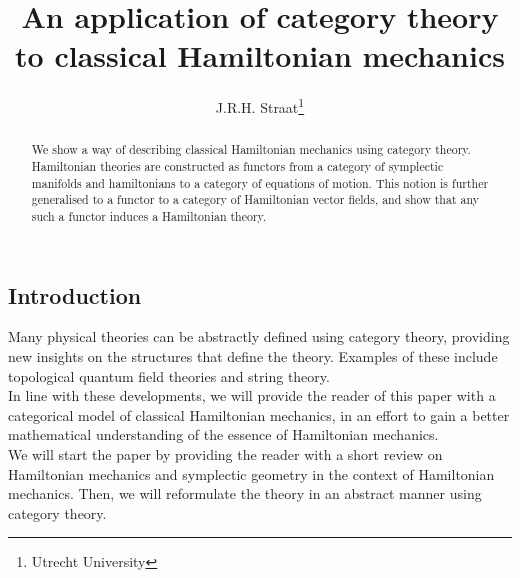 \documentclass{article}
\title{An application of category theory to classical Hamiltonian mechanics}
\author{J.R.H. Straat\thanks{Utrecht University}}%
\date{}
\begin{document}
\maketitle
%
\begin{abstract}
	We show a way of describing classical Hamiltonian mechanics using category theory. Hamiltonian theories are constructed as functors from a category of symplectic manifolds and hamiltonians to a category of equations of motion. This notion is further generalised to a functor to a category of Hamiltonian vector fields, and show that any such a functor induces a Hamiltonian theory.
\end{abstract}
%
\begin{multicols}{2}
	\section{Introduction}
	Many physical theories can be abstractly defined using category theory, providing new insights on the structures that define the theory. Examples of these include topological quantum field theories\cite{BaezTQFT} and string theory\cite{Douglas_2001}.\\
	In line with these developments, we will provide the reader of this paper with a categorical model of classical Hamiltonian mechanics, in an effort to gain a better mathematical understanding of the essence of Hamiltonian mechanics.\\
	We will start the paper by providing the reader with a short review on Hamiltonian mechanics and symplectic geometry in the context of Hamiltonian mechanics. Then, we will reformulate the theory in an abstract manner using category theory.

\end{multicols}
\end{document}
